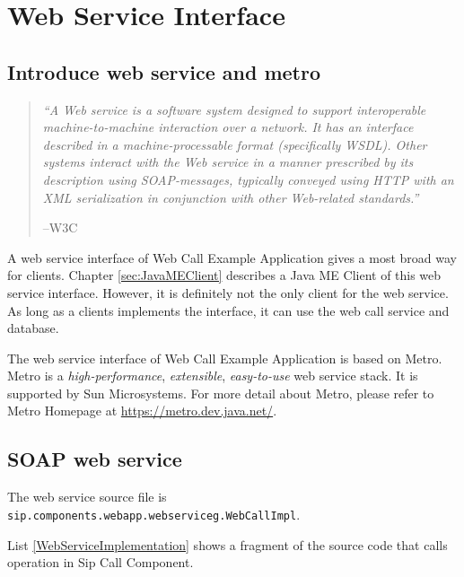 
\chapter{Web Service Interface}
\label{sec:WebServiceInterface}

\section{Introduce web service and metro}

\begin{quote}
\textit{``A Web service is a software system designed to support interoperable machine-to-machine interaction over a network. It has an interface described in a machine-processable format (specifically WSDL). Other systems interact with the Web service in a manner prescribed by its description using SOAP-messages, typically conveyed using HTTP with an XML serialization in conjunction with other Web-related standards.''}\cite{WebServicesW3C}
\begin{flushright}
--W3C
\end{flushright}
\end{quote}

A web service interface of Web Call Example Application gives a most broad way for clients. Chapter \ref{sec:JavaMEClient} describes a Java ME Client of this web service interface. However, it is definitely not the only client for the web service. As long as a clients implements the interface, it can use the web call service and database. 

The web service interface of Web Call Example Application is based on \textsf{Metro}. Metro is a \textit{high-performance}, \textit{extensible}, \textit{easy-to-use} web service stack\cite{MetroHomepage}. It is supported by Sun Microsystems. For more detail about Metro, please refer to Metro Homepage at \href{https://metro.dev.java.net/}{https://metro.dev.java.net/}. 

\section{SOAP web service}

The web service source file is \\ \texttt{sip.components.webapp.webserviceg.WebCallImpl}. 

List \ref{WebServiceImplementation} shows a fragment of the source code that calls operation in Sip Call Component. 


